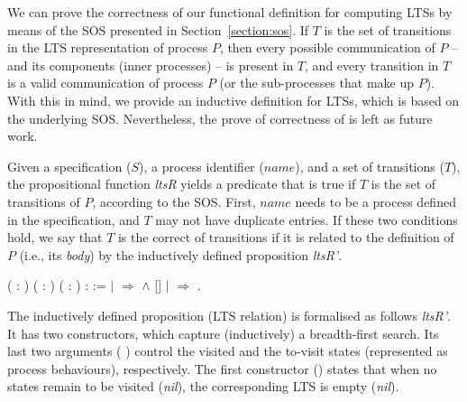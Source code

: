 We can prove the correctness of our functional definition for computing LTSs by means of the SOS presented in Section~\ref{section:sos}. If $ T $ is the set of transitions in the LTS representation of process $ P $, then every possible communication of $ P $ -- and its components (inner processes) -- is present in $ T $, and every transition in $ T $ is a valid communication of process $ P $ (or the sub-processes that make up $ P $). With this in mind, we provide an inductive definition for LTSs, which is based on the underlying SOS. Nevertheless, the prove of correctness of  is left as future work.

Given a specification ($S$), a process identifier ($name$), and a set of transitions ($T$), the propositional function \emph{ltsR} yields a predicate that is true if $T$ is the set of transitions of $P$, according to the \CSPcoq{} SOS. First, $name$ needs to be a process defined in the specification, and $T$ may not have duplicate entries. If these two conditions hold, we say that $T$ is the correct of transitions if it is related to the definition of $P$ (i.e., its \emph{body}) by the inductively defined proposition \emph{ltsR'}.

\begin{coqdoccode}
	\coqdocnoindent
	  ( : ) ( : ) ( :  ) :  :=\coqdoceol
	\coqdocindent{1.00em}
	    \coqdoceol
	\coqdocindent{1.00em}
	\ensuremath{|}   \ensuremath{\Rightarrow}   \ensuremath{\land}    [] \coqdoceol
	\coqdocindent{1.00em}
	\ensuremath{|}  \ensuremath{\Rightarrow} \coqdoceol
	\coqdocindent{1.00em}
	.\coqdoceol
\end{coqdoccode}	

The inductively defined proposition (LTS relation) is formalised as follows \emph{ltsR'}. It has two constructors, which capture (inductively) a breadth-first search. Its last two arguments ( ) control the visited and the to-visit states (represented as process behaviours), respectively. The first constructor () states that when no states remain to be visited (\emph{nil}), the corresponding LTS is empty (\emph{nil}).
	
